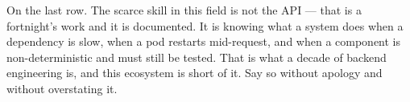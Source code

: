 \begin{note}
On the last row. The scarce skill in this field is not the API --- that is a
fortnight's work and it is documented. It is knowing what a system does when a
dependency is slow, when a pod restarts mid-request, and when a component is
non-deterministic and must still be tested. That is what a decade of backend
engineering is, and this ecosystem is short of it. Say so without apology and
without overstating it.
\end{note}
